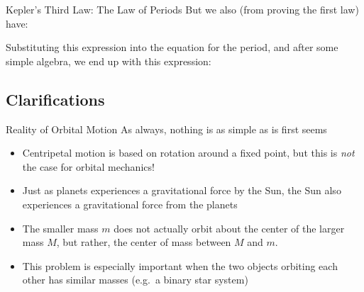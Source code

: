 \documentclass[12pt,compress,aspectratio=169]{beamer}
\newcommand{\eq}[2]{\vspace{#1}{\Large\begin{displaymath}#2\end{displaymath}}}
\begin{document}
\begin{frame}{Kepler's Third Law: The Law of Periods}
  But we also (from proving the first law) have:

  \eq{-.2in}{
    a(1-e^2)=\frac{L^2}{GMm^2}
  }

  Substituting this expression into the equation for the period, and after
  some simple algebra, we end up with this expression:

  \eq{-.2in}{
    \boxed{T^2
      =\left[\frac{4\pi^2}{GM}\right] a^3
    }
  }
\end{frame}





\subsection{Clarifications}

\begin{frame}{Reality of Orbital Motion}
  As always, nothing is as simple as is first seems
  \begin{itemize}
  \item Centripetal motion is based on rotation around a fixed point, but this
    is \emph{not} the case for orbital mechanics!
  \item Just as planets experiences a gravitational force by the Sun, the Sun
    also experiences a gravitational force from the planets
  \item The smaller mass $m$ does not actually orbit about the center of the
    larger mass $M$, but rather, the center of mass between $M$ and $m$.
  \item This problem is especially important when the two objects orbiting each
    other has similar masses (e.g.\ a binary star system)
  \end{itemize}
\end{frame}
\end{document}
